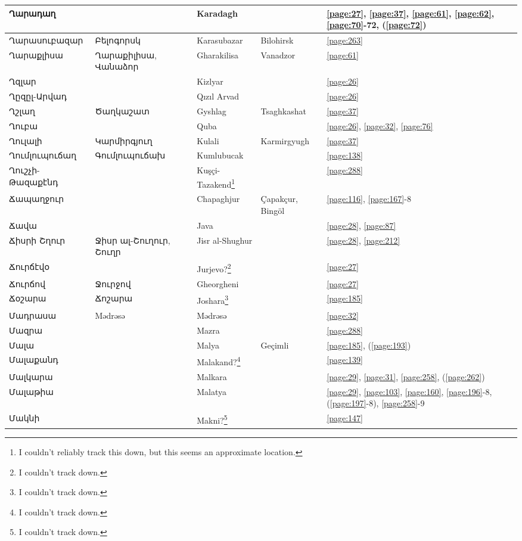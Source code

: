 \begin{center}
\begin{longtable}{|p{}|p{3cm}|p{3cm}|p{2cm}|p{3cm}|}
Ղարադաղ& &Karadagh & &\ref{page:27}, \ref{page:37}, \ref{page:61}, \ref{page:62}, \ref{page:70}-72, (\ref{page:72})\\ \hline
Ղարասուբազար& Բելոգորսկ&Karasubazar  &Bilohirsk &\ref{page:263}\\ \hline
Ղարաքլիսա&Ղարաքիլիսա, Վանաձոր &Gharakilisa & Vanadzor &\ref{page:61}\\ \hline
Ղզլար& &Kizlyar & &\ref{page:26}\\ \hline
Ղըզըլ-Արվադ& &Qızıl Arvad & &\ref{page:26}\\ \hline
Ղշլաղ&  Ծաղկաշատ&Gyshlag &Tsaghkashat &\ref{page:37}\\ \hline
Ղուբա& &Quba & &\ref{page:26}, \ref{page:32}, \ref{page:76}\\ \hline
Ղուլալի&Կարմիրգյուղ &Kulali & Karmirgyugh  &\ref{page:37}\\ \hline
Ղումլուպուճաղ& Գումլուպուճախ& Kumlubucak& &\ref{page:138}\\ \hline
Ղուշչի-Թազաքէնդ& & Kuşçi-Tazakend\footnote{I couldn't reliably track this down, but this seems an approximate location.}& &\ref{page:288}\\ \hline
Ճապաղջուր& &Chapaghjur & Çapakçur, Bingöl&\ref{page:116}, \ref{page:167}-8\\ \hline
Ճավա& & Java& &\ref{page:28}, \ref{page:87}\\ \hline
Ճիսրի Շղուր& Ջիսր ալ-Շուղուր, Շուղր&Jisr al-Shughur & &\ref{page:28}, \ref{page:212}\\ \hline
Ճուրճէվօ& &Jurjevo?\footnote{I couldn't track down.} & &\ref{page:27}\\ \hline
Ճուրճով& Ջուրջով&Gheorgheni & &\ref{page:27}\\ \hline
Ճօշարա&Ճոշարա &Joshara\footnote{I couldn't track down. } & &\ref{page:185}\\ \hline
Մադրասա&Mədrəsə& Mədrəsə& &\ref{page:32}\\ \hline
Մազրա& &Mazra & &\ref{page:288}\\ \hline
Մալա& & Malya& Geçimli&\ref{page:185}, (\ref{page:193})\\ \hline
Մալաքանդ& & Malakand?\footnote{I couldn't track down.}& &\ref{page:139}\\ \hline
Մալկարա& &Malkara & &\ref{page:29}, \ref{page:31}, \ref{page:258}, (\ref{page:262})\\ \hline
Մալաթիա& & Malatya& &\ref{page:29}, \ref{page:103}, \ref{page:160}, \ref{page:196}-8, (\ref{page:197}-8), \ref{page:258}-9\\ \hline
Մակնի& & Makni?\footnote{I couldn't track down.}& &\ref{page:147}\\ \hline

\end{longtable}
\end{center}
